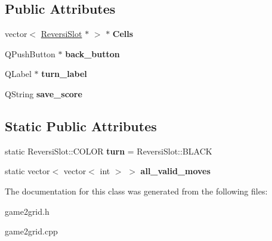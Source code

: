 \subsection*{Public Attributes}
\begin{DoxyCompactItemize}
\item 
\mbox{\label{classGame2Grid_a7ea67a012555b1d0ebb399f8dc5727f7}} 
vector$<$ \hyperlink{classReversiSlot}{Reversi\+Slot} $\ast$ $>$ $\ast$ {\bfseries Cells}
\item 
\mbox{\label{classGame2Grid_af6253e3276dc0761176754d7b809bbe0}} 
Q\+Push\+Button $\ast$ {\bfseries back\+\_\+button}
\item 
\mbox{\label{classGame2Grid_a8fa6b4617803602470c056b31d637f31}} 
Q\+Label $\ast$ {\bfseries turn\+\_\+label}
\item 
\mbox{\label{classGame2Grid_a7928ebdf454b758fc661ad9165b8dc91}} 
Q\+String {\bfseries save\+\_\+score}
\end{DoxyCompactItemize}
\subsection*{Static Public Attributes}
\begin{DoxyCompactItemize}
\item 
\mbox{\label{classGame2Grid_a1b09031451ce6d9644e40d7e7a36697e}} 
static Reversi\+Slot\+::\+C\+O\+L\+OR {\bfseries turn} = Reversi\+Slot\+::\+B\+L\+A\+CK
\item 
\mbox{\label{classGame2Grid_a8cceb431251ac1f4583aaf2698265efb}} 
static vector$<$ vector$<$ int $>$ $>$ {\bfseries all\+\_\+valid\+\_\+moves}
\end{DoxyCompactItemize}


The documentation for this class was generated from the following files\+:\begin{DoxyCompactItemize}
\item 
game2grid.\+h\item 
game2grid.\+cpp\end{DoxyCompactItemize}
